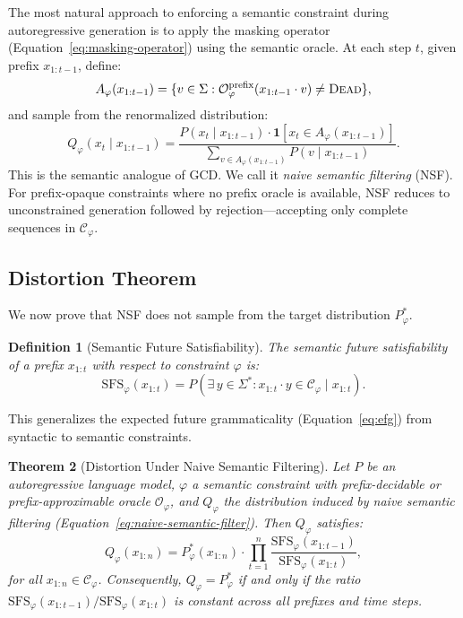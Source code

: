 \documentclass[twoside,11pt]{article}
\newtheorem{theorem}{Theorem}[section]
\newtheorem{definition}[theorem]{Definition}
\newcommand{\Vocab}{\Sigma}
\newcommand{\Oracle}{\mathcal{O}}
\newcommand{\Constraint}{\mathcal{C}}
\newcommand{\indicator}{\mathbf{1}}
\newcommand{\SFS}{\mathrm{SFS}}
\begin{document}
The most natural approach to enforcing a semantic constraint during
autoregressive generation is to apply the masking operator
(Equation~\ref{eq:masking-operator}) using the semantic oracle. At each step
$t$, given prefix $x_{1:t-1}$, define:
\begin{equation}
\label{eq:semantic-allowed}
A_\varphi(x_{1:t-1}) = \{v \in \Vocab :
\Oracle_\varphi^{\mathrm{prefix}}(x_{1:t-1} \cdot v) \neq \textsc{Dead}\},
\end{equation}
and sample from the renormalized distribution:
\begin{equation}
\label{eq:naive-semantic-filter}
Q_\varphi(x_t \mid x_{1:t-1}) = \frac{P(x_t \mid x_{1:t-1}) \cdot
\indicator[x_t \in A_\varphi(x_{1:t-1})]}{\sum_{v \in A_\varphi(x_{1:t-1})}
P(v \mid x_{1:t-1})}.
\end{equation}
This is the semantic analogue of GCD. We call it \emph{naive semantic
filtering} (NSF). For prefix-opaque constraints where no prefix oracle is
available, NSF reduces to unconstrained generation followed by
rejection---accepting only complete sequences in $\Constraint_\varphi$.

\subsection{Distortion Theorem}
\label{sec:distortion-theorem}

We now prove that NSF does not sample from the target distribution
$P^*_\varphi$.

\begin{definition}[Semantic Future Satisfiability]
\label{def:sfs}
The \emph{semantic future satisfiability} of a prefix $x_{1:t}$ with respect
to constraint $\varphi$ is:
\begin{equation}
\label{eq:sfs}
\SFS_\varphi(x_{1:t}) = P(\exists\, y \in \Vocab^* : x_{1:t} \cdot y \in
\Constraint_\varphi \mid x_{1:t}).
\end{equation}
\end{definition}

This generalizes the expected future grammaticality (Equation~\ref{eq:efg})
from syntactic to semantic constraints.

\begin{theorem}[Distortion Under Naive Semantic Filtering]
\label{thm:distortion}
Let $P$ be an autoregressive language model, $\varphi$ a semantic constraint
with prefix-decidable or prefix-approximable oracle $\Oracle_\varphi$, and
$Q_\varphi$ the distribution induced by naive semantic filtering
(Equation~\ref{eq:naive-semantic-filter}). Then $Q_\varphi$ satisfies:
\begin{equation}
\label{eq:distorted-distribution}
Q_\varphi(x_{1:n}) = P^*_\varphi(x_{1:n}) \cdot
\prod_{t=1}^{n} \frac{\SFS_\varphi(x_{1:t-1})}{\SFS_\varphi(x_{1:t})},
\end{equation}
for all $x_{1:n} \in \Constraint_\varphi$. Consequently, $Q_\varphi =
P^*_\varphi$ if and only if the ratio
$\SFS_\varphi(x_{1:t-1}) / \SFS_\varphi(x_{1:t})$ is constant across all
prefixes and time steps.
\end{theorem}
\end{document}
